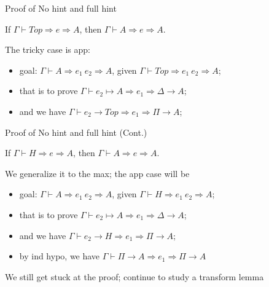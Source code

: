 \begin{frame}{Proof of No hint and full hint}
\begin{lemma}
If $\Gamma \vdash Top \Rightarrow e \Rightarrow A$, then $\Gamma \vdash A \Rightarrow e \Rightarrow A$.
\end{lemma}
The tricky case is app:
\begin{itemize}
	\item goal: $\Gamma \vdash A \Rightarrow e_1~e_2 \Rightarrow A$, given $\Gamma \vdash Top \Rightarrow e_1~e_2 \Rightarrow A$;
	\item that is to prove $\Gamma \vdash \boxed{e_2} \mapsto A \Rightarrow e_1 \Rightarrow \Delta \rightarrow A$;
	\item and we have $\Gamma \vdash \boxed{e_2} \rightarrow Top \Rightarrow e_1 \Rightarrow \Pi \rightarrow A$;
\end{itemize}
\end{frame}

\begin{frame}{Proof of No hint and full hint (Cont.)}
\begin{lemma}
If $\Gamma \vdash H \Rightarrow e \Rightarrow A$, then $\Gamma \vdash A \Rightarrow e \Rightarrow A$.
\end{lemma}

We generalize it to the max; the app case will be
\begin{itemize}
	\item goal: $\Gamma \vdash A \Rightarrow e_1~e_2 \Rightarrow A$, given $\Gamma \vdash H \Rightarrow e_1~e_2 \Rightarrow A$;
	\item that is to prove $\Gamma \vdash \boxed{e_2} \mapsto A \Rightarrow e_1 \Rightarrow \Delta \rightarrow A$;
	\item and we have $\Gamma \vdash \boxed{e_2} \rightarrow H \Rightarrow e_1 \Rightarrow \Pi \rightarrow A$;
	\item by ind hypo, we have $\Gamma \vdash \Pi \rightarrow A \Rightarrow e_1 \Rightarrow \Pi \rightarrow A$
\end{itemize}

We still get stuck at the proof; continue to study a transform lemma
\end{frame}

